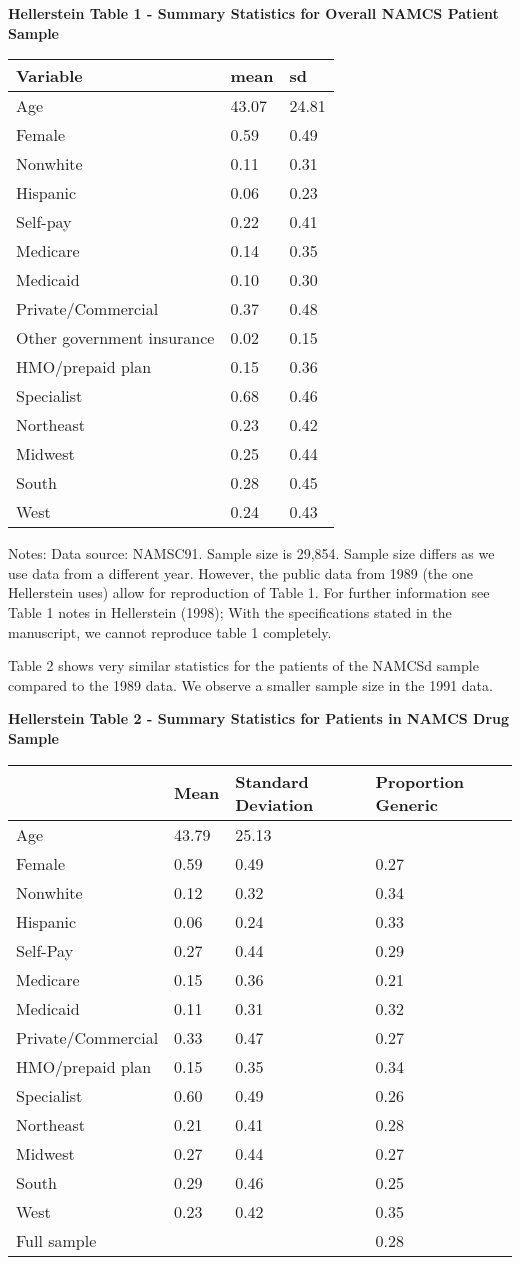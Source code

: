 \documentclass[
]{book}
\begin{document}
\textbf{Hellerstein Table 1 - Summary Statistics for Overall NAMCS
Patient Sample}

\begin{longtable}[]{@{}lll@{}}
\toprule
Variable & mean & sd\tabularnewline
\midrule
\endhead
Age & 43.07 & 24.81\tabularnewline
Female & 0.59 & 0.49\tabularnewline
Nonwhite & 0.11 & 0.31\tabularnewline
Hispanic & 0.06 & 0.23\tabularnewline
Self-pay & 0.22 & 0.41\tabularnewline
Medicare & 0.14 & 0.35\tabularnewline
Medicaid & 0.10 & 0.30\tabularnewline
Private/Commercial & 0.37 & 0.48\tabularnewline
Other government insurance & 0.02 & 0.15\tabularnewline
HMO/prepaid plan & 0.15 & 0.36\tabularnewline
Specialist & 0.68 & 0.46\tabularnewline
Northeast & 0.23 & 0.42\tabularnewline
Midwest & 0.25 & 0.44\tabularnewline
South & 0.28 & 0.45\tabularnewline
West & 0.24 & 0.43\tabularnewline
\bottomrule
\end{longtable}

Notes: Data source: NAMSC91. Sample size is 29,854. Sample size differs
as we use data from a different year. However, the public data from 1989
(the one Hellerstein uses) allow for reproduction of Table 1. For
further information see Table 1 notes in Hellerstein (1998); With the
specifications stated in the manuscript, we cannot reproduce table 1
completely.

Table 2 shows very similar statistics for the patients of the NAMCSd
sample compared to the 1989 data. We observe a smaller sample size in
the 1991 data.

\textbf{Hellerstein Table 2 - Summary Statistics for Patients in NAMCS
Drug Sample}

\begin{longtable}[]{@{}llll@{}}
\toprule
& Mean & Standard Deviation & Proportion Generic\tabularnewline
\midrule
\endhead
Age & 43.79 & 25.13 &\tabularnewline
Female & 0.59 & 0.49 & 0.27\tabularnewline
Nonwhite & 0.12 & 0.32 & 0.34\tabularnewline
Hispanic & 0.06 & 0.24 & 0.33\tabularnewline
Self-Pay & 0.27 & 0.44 & 0.29\tabularnewline
Medicare & 0.15 & 0.36 & 0.21\tabularnewline
Medicaid & 0.11 & 0.31 & 0.32\tabularnewline
Private/Commercial & 0.33 & 0.47 & 0.27\tabularnewline
HMO/prepaid plan & 0.15 & 0.35 & 0.34\tabularnewline
Specialist & 0.60 & 0.49 & 0.26\tabularnewline
Northeast & 0.21 & 0.41 & 0.28\tabularnewline
Midwest & 0.27 & 0.44 & 0.27\tabularnewline
South & 0.29 & 0.46 & 0.25\tabularnewline
West & 0.23 & 0.42 & 0.35\tabularnewline
Full sample & & & 0.28\tabularnewline
\bottomrule
\end{longtable}
\end{document}
